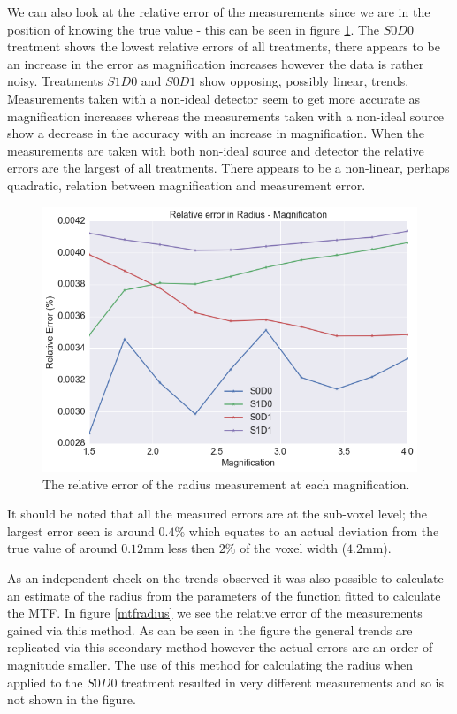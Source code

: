 \documentclass[
  twoside,
  11pt, a4paper,
  footinclude=true,
  headinclude=true,
  cleardoublepage=empty
]{scrbook}
\begin{document}
We can also look at the relative error of the measurements since we are in the position of knowing the true value - this can be seen in figure \ref{relerrormeasuredradius}. The $S0D0$ treatment shows the lowest relative errors of all treatments, there appears to be an increase in the error as magnification increases however the data is rather noisy. Treatments $S1D0$ and $S0D1$ show opposing, possibly linear, trends. Measurements taken with a non-ideal detector seem to get more accurate as magnification increases whereas the measurements taken with a non-ideal source show a decrease in the accuracy with an increase in magnification. When the measurements are taken with both non-ideal source and detector the relative errors are the largest of all treatments. There appears to be a non-linear, perhaps quadratic, relation between magnification and measurement error.

\begin{figure}[h!]
  \centering
    \includegraphics[width=\textwidth]{code/RadiusMeasurements/Plots_RadiusCentre_files/Plots_RadiusCentre_3_0.png}
    \caption{The relative error of the radius measurement at each magnification.}
        \label{relerrormeasuredradius}
\end{figure}

It should be noted that all the measured errors are at the sub-voxel level; the largest error seen is around $0.4\%$ which equates to an actual deviation from the true value of around $0.12$mm less then $2\%$ of the voxel width ($4.2$mm).

As an independent check on the trends observed it was also possible to calculate an estimate of the radius from the parameters of the function fitted to calculate the MTF. In figure \ref{mtfradius} we see the relative error of the measurements gained via this method. As can be seen in the figure the general trends  are replicated via this secondary method however the actual errors are an order of magnitude smaller. The use of this method for calculating the radius when applied to the $S0D0$ treatment resulted in very different measurements and so is not shown in the figure.
\end{document}
